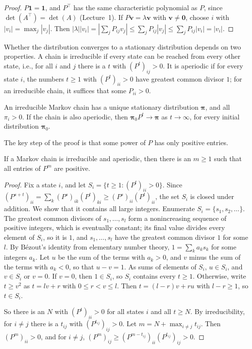 \begin{proof}
    $P\mathbf{1} = \mathbf{1}$, and $P^\top$ has the same characteristic polynomial as $P$, since $\det(A^\top) = \det(A)$ (Lecture~1). If $P\mathbf{v} = \lambda\mathbf{v}$ with $\mathbf{v} \neq \mathbf{0}$, choose $i$ with $|v_i| = \max_j |v_j|$. Then $|\lambda||v_i| = |\sum_j P_{ij}v_j| \leq \sum_j P_{ij}|v_j| \leq \sum_j P_{ij}|v_i| = |v_i|$.
\end{proof}

Whether the distribution converges to a stationary distribution depends on two properties. A chain is irreducible if every state can be reached from every other state, i.e., for all $i$ and $j$ there is a $t$ with $(P^t)_{ij} > 0$. It is aperiodic if for every state $i$, the numbers $t \geq 1$ with $(P^t)_{ii} > 0$ have greatest common divisor $1$; for an irreducible chain, it suffices that some $P_{ii} > 0$.

\begin{theorem}\label{L4-thm:markov-convergence}
    An irreducible Markov chain has a unique stationary distribution $\boldsymbol{\pi}$, and all $\pi_i > 0$. If the chain is also aperiodic, then $\boldsymbol{\pi}_0 P^t \to \boldsymbol{\pi}$ as $t \to \infty$, for every initial distribution $\boldsymbol{\pi}_0$.
\end{theorem}

The key step of the proof is that some power of $P$ has only positive entries.

\begin{lemma}\label{L4-lem:positive-power}
    If a Markov chain is irreducible and aperiodic, then there is an $m \geq 1$ such that all entries of $P^m$ are positive.
\end{lemma}

\begin{proof}
    Fix a state $i$, and let $S_i = \{t \geq 1 : (P^t)_{ii} > 0\}$. Since $(P^{s+t})_{ii} = \sum_k (P^s)_{ik}(P^t)_{ki} \geq (P^s)_{ii}(P^t)_{ii}$, the set $S_i$ is closed under addition. We show that it contains all large integers. Enumerate $S_i = \{s_1, s_2, \ldots\}$. The greatest common divisors of $s_1, \ldots, s_l$ form a nonincreasing sequence of positive integers, which is eventually constant; its final value divides every element of $S_i$, so it is $1$, and $s_1, \ldots, s_l$ have the greatest common divisor $1$ for some $l$. By B\'ezout's identity from elementary number theory, $1 = \sum_k a_ks_k$ for some integers $a_k$. Let $u$ be the sum of the terms with $a_k > 0$, and $v$ minus the sum of the terms with $a_k < 0$, so that $u - v = 1$. As sums of elements of $S_i$, $u \in S_i$, and $v \in S_i$ or $v = 0$. If $v = 0$, then $1 \in S_i$, so $S_i$ contains every $t \geq 1$. Otherwise, write $t \geq v^2$ as $t = lv + r$ with $0 \leq r < v \leq l$. Then $t = (l - r)v + ru$ with $l - r \geq 1$, so $t \in S_i$.

    So there is an $N$ with $(P^t)_{ii} > 0$ for all states $i$ and all $t \geq N$. By irreducibility, for $i \neq j$ there is a $t_{ij}$ with $(P^{t_{ij}})_{ij} > 0$. Let $m = N + \max_{i \neq j} t_{ij}$. Then $(P^m)_{ii} > 0$, and for $i \neq j$, $(P^m)_{ij} \geq (P^{m - t_{ij}})_{ii}(P^{t_{ij}})_{ij} > 0$.
\end{proof}

